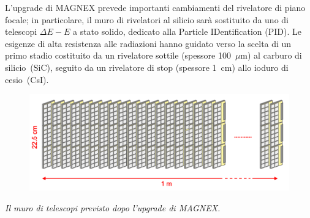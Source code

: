\documentclass[10pt,foldmark]{leaflet}
\begin{document}
L'upgrade di MAGNEX prevede importanti cambiamenti del rivelatore di piano focale; in particolare, il muro di rivelatori al silicio sarà sostituito da uno di telescopi $\Delta E - E$ a stato solido, dedicato alla Particle IDentification (PID). 
Le esigenze di alta resistenza alle radiazioni hanno guidato verso la scelta di un primo stadio costituito da un rivelatore sottile (spessore 100~$\mu$m) al carburo di silicio~(SiC), seguito da un rivelatore di stop (spessore 1~cm) allo ioduro di cesio~(CsI).

\begin{figure} [!h]
	\centering
	\includegraphics[width=0.88\columnwidth, keepaspectratio]{Grafici/muro_telescopi.png}
\end{figure}
\hspace{0.2 cm}\textit{Il muro di telescopi previsto dopo l'upgrade di MAGNEX.}
\end{document}
